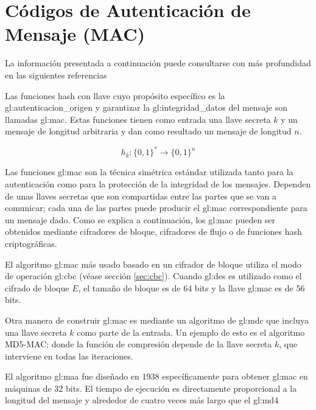 %
%

\section{Códigos de Autenticación de Mensaje (MAC)}
La información presentada a continuación puede consultarse con más profundidad
en las siguientes referencias
\cite{DBLP:series/isc/DelfsK07, menezes, mac_patel}

Las funciones hash con llave cuyo propósito específico es la
\gls{gl:autenticacion_origen} y garantizar la \gls{gl:integridad_datos} del
mensaje son llamadas \acrlong{gl:mac}. Estas funciones tienen como entrada
una llave secreta $k$ y un mensaje de longitud arbitraria y dan como resultado
un mensaje de longitud $n$.

\begin{equation}
  \label{funcion_hash_mac}
  h_k: \{0, 1\}^* \longrightarrow \{0,1\}^n
\end{equation}

Las funciones \acrshort{gl:mac} son la técnica simétrica
estándar utilizada tanto para la autenticación como para la protección de la
integridad de los mensajes. Dependen de unas llaves secretas que son
compartidas entre las partes que se van a comunicar; cada una de las
partes puede producir el \acrshort{gl:mac} correspondiente para un mensaje
dado. Como se explica a continuación, los \acrshort{gl:mac} pueden ser
obtenidos mediante cifradores de bloque, cifradores de flujo o de funciones
hash criptográficas.

El algoritmo \acrshort{gl:mac} más usado basado en un cifrador de bloque
utiliza el modo de operación \acrshort{gl:cbc} (véase sección \ref{sec:cbc}). 
Cuando \acrshort{gl:des} es utilizado como el cifrado de bloque $E$, el tamaño 
de bloque es de 64 bits y la llave \acrshort{gl:mac} es de 56 bits.

Otra manera de construir \acrshort{gl:mac} es mediante un algoritmo
de \acrshort{gl:mdc} que incluya una llave secreta $k$ como parte de la
entrada. Un ejemplo de esto es el algoritmo MD5-MAC; donde la función de
compresión depende de la llave secreta $k$, que interviene en todas las
iteraciones.

El algoritmo \acrshort{gl:maa} fue diseñado en 1938 específicamente para
obtener \acrshort{gl:mac} en máquinas de 32 bits. El tiempo de ejecución
es directamente proporcional a la longitud del mensaje y alrededor de cuatro
veces más largo que el \acrshort{gl:md4}
